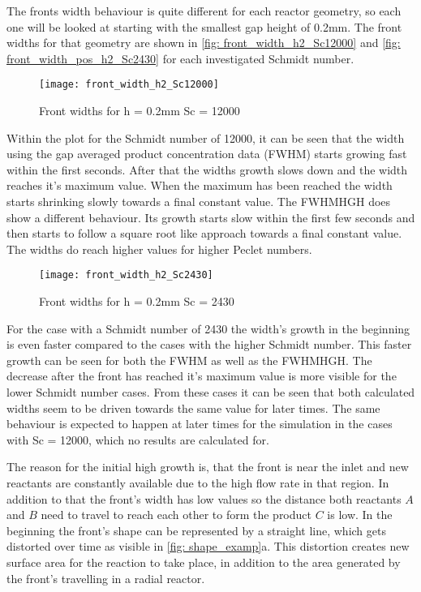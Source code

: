 \documentclass[../thesis.tex]{subfiles}
\begin{document}
The fronts width behaviour is quite different for each reactor geometry, so each one will be looked at starting with the smallest gap height of 0.2mm. The front widths for that geometry are shown in \autoref{fig: front_width_h2_Sc12000} and \autoref{fig: front_width_pos_h2_Sc2430} for each investigated Schmidt number.
\begin{figure}[htbp]
	\centering
	\texttt{[image: front\_width\_h2\_Sc12000]}
	\caption{Front widths for  h = 0.2mm Sc = 12000
	\label{fig: front_width_h2_Sc12000}}
\end{figure}
Within the plot for the Schmidt number of 12000, it can be seen that the width using the gap averaged product concentration data (FWHM) starts growing fast within the first seconds. After that the widths growth slows down and the width reaches it's maximum value. When the maximum has been reached the width starts shrinking slowly towards a final constant value. The FWHMHGH does show a different behaviour. Its growth starts slow within the first few seconds and then starts to follow a square root like approach towards a final constant value. The widths do reach higher values for higher Peclet numbers.
\begin{figure}[htbp]
	\centering
	\texttt{[image: front\_width\_h2\_Sc2430]}
	\caption{Front widths for  h = 0.2mm Sc = 2430}
	\label{fig: front_width_pos_h2_Sc2430}
\end{figure}
For the case with a Schmidt number of 2430 the width's growth in the beginning is even faster compared to the cases with the higher Schmidt number. This faster growth can be seen for both the FWHM as well as the FWHMHGH. The decrease after the front has reached it's maximum value is more visible for the lower Schmidt number cases. From these cases it can be seen that both calculated widths seem to be driven towards the same value for later times. The same behaviour is expected to happen at later times for the simulation in the cases with Sc = 12000, which no results are calculated for.

The reason for the initial high growth is, that the front is near the inlet and new reactants are constantly available due to the high flow rate in that region. In addition to that the front's width has low values so the distance both reactants $A$ and $B$ need to travel to reach each other to form the product $C$ is low. In the beginning the front's shape can be represented by a straight line, which gets distorted over time as visible in \autoref{fig: shape_examp}a. This distortion creates new surface area for the reaction to take place, in addition to the area generated by the front's travelling in a radial reactor.
\end{document}
